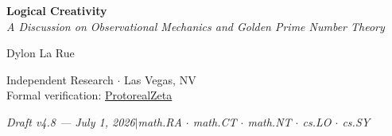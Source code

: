 \begin{center}
\vspace*{0.5em}
{\LARGE\bfseries Logical Creativity}\\[12pt]
{\large\itshape A Discussion on Observational Mechanics and Golden Prime Number Theory}

\vspace{1.5em}
{\large Dylon La Rue}

\vspace{0.5em}
{\small Independent Research $\cdot$ Las Vegas, NV\\
Formal verification: \href{https://github.com/Dielawn-01/ProtorealZeta}{ProtorealZeta}}

\vspace{0.5em}
{\small\itshape Draft v4.8 --- July 1, 2026\quad$|$\quad math.RA $\cdot$ math.CT $\cdot$ math.NT $\cdot$ cs.LO $\cdot$ cs.SY}
\end{center}

\vspace{1em}

